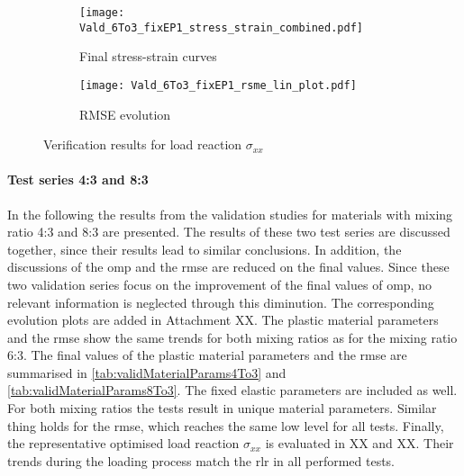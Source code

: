 \begin{figure}[H]
\centering
\begin{subfigure}[t]{0.495\textwidth}
    \centering
    \texttt{[image: Vald\_6To3\_fixEP1\_stress\_strain\_combined.pdf]}
    \caption{ Final stress-strain curves}
    \label{fig:validStressStrain6to3}
\end{subfigure}
\hfill
\begin{subfigure}[t]{0.495\textwidth}
    \centering
    \centering
    \texttt{[image: Vald\_6To3\_fixEP1\_rsme\_lin\_plot.pdf]}
    \caption{RMSE evolution}
    \label{fig:validRMSE6to3}
\end{subfigure}
\caption{Verification results for load reaction $\sigma_{xx}$}
\label{fig:validRes6to3}
\end{figure}





\paragraph{Test series 4:3 and 8:3}
In the following the results from the validation studies for materials with mixing ratio 4:3 and 8:3 are presented. The results of these two test series are discussed together, since their results lead to similar conclusions. In addition, the discussions of the \acrlong{omp} and the \acrshort{rmse} are reduced on the final values. Since these two validation series focus on the improvement of the final values of \acrlong{omp}, no relevant information is neglected through this diminution. The corresponding evolution plots are added in Attachment XX. The plastic material parameters and the \acrshort{rmse} show the same trends for both mixing ratios as for the mixing ratio 6:3. The final values of the plastic material parameters and the \acrshort{rmse} are summarised in \autoref{tab:validMaterialParams4To3} and \autoref{tab:validMaterialParams8To3}. The fixed elastic parameters are included as well. 
For both mixing ratios the tests result in unique material parameters. Similar thing holds for the \acrshort{rmse}, which reaches the same low level for all tests. Finally, the representative optimised load reaction $\sigma_{xx}$ is evaluated in XX and XX. Their trends during the loading process match the \acrlong{rlr} in all performed tests.

